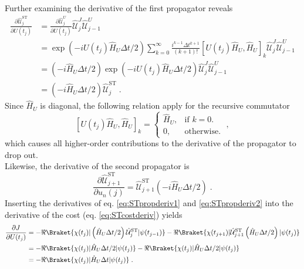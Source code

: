 Further examining the derivative of the first propagator reveals
\begin{align}
	\frac{\partial \hat{\mathcal{U}}_{j}^{\mathrm{ST}}}{\partial U (t_j)} &=  \frac{\partial \hat{\mathcal{U}}_{j}^{U}}{\partial U (t_j)} \hat{\mathcal{U}}_{j}^{J} \hat{\mathcal{U}}_{j-1}^{U} \nonumber \\
	&=  \exp \left( -i U (t_j) \hat{H}_U  \Delta t /2 \right)  \sum_{k = 0}^{\infty }  \frac{i^{k-1} \Delta t^{k+1}}{(k+1)!} \left[ U (t_j) \hat{H}_U  ,  \hat{H}_U \right]_k \hat{\mathcal{U}}_{j}^{J} \hat{\mathcal{U}}_{j-1}^{U} \nonumber \\
	&= \left( -i \hat{H}_U \Delta t /2 \right) \exp \left( -i U(t_j) \hat{H}_U  \Delta t /2 \right)   \hat{\mathcal{U}}_{j}^{J} \hat{\mathcal{U}}_{j-1}^{U} \nonumber \\
	&= \left( -i \hat{H}_U \Delta t /2 \right) \hat{\mathcal{U}}_{j}^{\mathrm{ST}} \; . \label{eq:STpropderiv1}
\end{align}
Since $\hat{H}_U$ is diagonal, the following relation apply for the recursive commutator 
\begin{equation}
	\left[ U (t_j) \hat{H}_U  ,  \hat{H}_U \right]_k =  
	\begin{cases}
    	\hat{H}_U, & \text{if $k = 0$}.\\
    	0, & \text{otherwise}.
  	\end{cases} \; ,
\end{equation}  
which causes all higher-order contributions to the derivative of the propagator to drop out.\\
Likewise, the derivative of the second propagator is
\begin{equation}
	\frac{\partial \hat{\mathcal{U}}_{j+1}^{\mathrm{ST}}}{\partial u_n (j)} =  \hat{\mathcal{U}}_{j+1}^{\mathrm{ST}} \left( -i \hat{H}_U \Delta t /2 \right) \; . \label{eq:STpropderiv2}
\end{equation}
Inserting the derivatives of eq. \eqref{eq:STpropderiv1} and \eqref{eq:STpropderiv2} into the derivative of the cost (eq. \eqref{eq:STcostderiv}) yields
\begin{align}
	\frac{\partial J}{\partial U (t_j)} &= - \Re \Braket{\chi (t_j) |   \left(  \hat{H}_U \Delta t /2 \right) \hat{\mathcal{U}}_{j}^{\mathrm{ST}} | \psi (t_{j-1})} - \Re \Braket{\chi (t_{j+1}) |  \hat{\mathcal{U}}_{j+1}^{\mathrm{ST}} \left(  \hat{H}_U \Delta t /2 \right) | \psi (t_{j})} \nonumber \\
	&= - \Re \Braket{\chi (t_j) |  \hat{H}_U \Delta t /2  | \psi (t_{j})} - \Re \Braket{\chi (t_{j}) |  \hat{H}_U \Delta t /2   | \psi (t_{j})} \nonumber \\
	&= - \Re \Braket{\chi (t_j) | \hat{H}_U \Delta t | \psi (t_{j})} \; . \label{eq:STcostgrad}
\end{align}  
